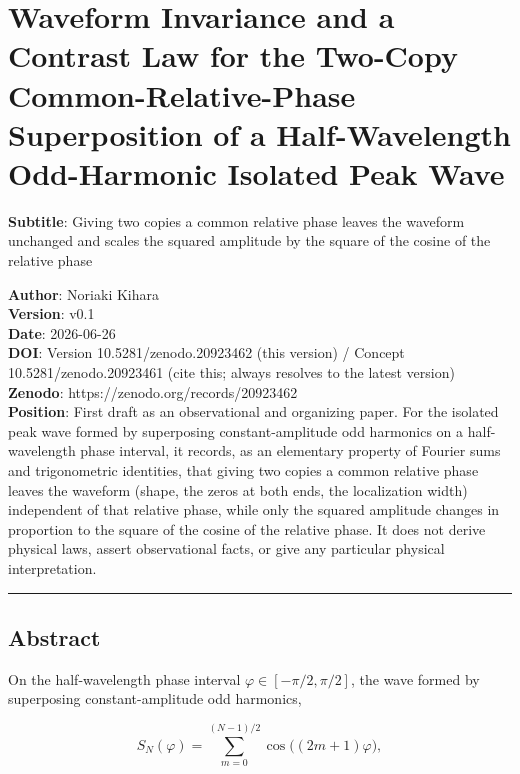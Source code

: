 \documentclass[
]{ltjsarticle}
\author{}
\date{}
\begin{document}
\section{Waveform Invariance and a Contrast Law for the Two-Copy
Common-Relative-Phase Superposition of a Half-Wavelength Odd-Harmonic
Isolated Peak
Wave}\label{waveform-invariance-and-a-contrast-law-for-the-two-copy-common-relative-phase-superposition-of-a-half-wavelength-odd-harmonic-isolated-peak-wave}

\textbf{Subtitle}: Giving two copies a common relative phase leaves the
waveform unchanged and scales the squared amplitude by the square of the
cosine of the relative phase

\textbf{Author}: Noriaki Kihara\\
\textbf{Version}: v0.1\\
\textbf{Date}: 2026-06-26\\
\textbf{DOI}: Version 10.5281/zenodo.20923462 (this version) / Concept
10.5281/zenodo.20923461 (cite this; always resolves to the latest
version)\\
\textbf{Zenodo}: https://zenodo.org/records/20923462\\
\textbf{Position}: First draft as an observational and organizing paper.
For the isolated peak wave formed by superposing constant-amplitude odd
harmonics on a half-wavelength phase interval, it records, as an
elementary property of Fourier sums and trigonometric identities, that
giving two copies a common relative phase leaves the waveform (shape,
the zeros at both ends, the localization width) independent of that
relative phase, while only the squared amplitude changes in proportion
to the square of the cosine of the relative phase. It does not derive
physical laws, assert observational facts, or give any particular
physical interpretation.

\begin{center}\rule{0.5\linewidth}{0.5pt}\end{center}

\subsection{Abstract}\label{abstract}

On the half-wavelength phase interval \(\varphi\in[-\pi/2,\pi/2]\), the
wave formed by superposing constant-amplitude odd harmonics,

\[
S_N(\varphi)=\sum_{m=0}^{(N-1)/2}\cos\!\big((2m+1)\varphi\big),
\]
\end{document}
